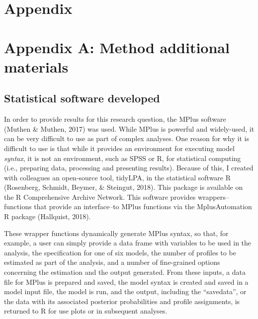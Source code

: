 \documentclass[]{book}
\theoremstyle{definition}
\theoremstyle{definition}
\theoremstyle{definition}
\theoremstyle{remark}
\begin{document}
\section{Appendix}\label{appendix}

\section{Appendix A: Method additional
materials}\label{appendix-a-method-additional-materials}

\subsection{Statistical software
developed}\label{statistical-software-developed-1}

In order to provide results for this research question, the MPlus
software (Muthen \& Muthen, 2017) was used. While MPlus is powerful and
widely-used, it can be very difficult to use as part of complex
analyses. One reason for why it is difficult to use is that while it
provides an environment for executing model \emph{syntax}, it is not an
environment, such as SPSS or R, for statistical computing (i.e.,
preparing data, processing and presenting results). Because of this, I
created with colleagues an open-source tool, tidyLPA, in the statistical
software R (Rosenberg, Schmidt, Beymer, \& Steingut, 2018). This package
is available on the R Comprehensive Archive Network. This software
provides wrappers--functions that provide an interface--to MPlus
functions via the MplusAutomation R package (Hallquist, 2018).

These wrapper functions dynamically generate MPlus syntax, so that, for
example, a user can simply provide a data frame with variables to be
used in the analysis, the specification for one of six models, the
number of profiles to be estimated as part of the analysis, and a number
of fine-grained options concerning the estimation and the output
generated. From these inputs, a data file for MPlus is prepared and
saved, the model syntax is created and saved in a model input file, the
model is run, and the output, including the ``savedata'', or the data
with its associated posterior probabilities and profile assignments, is
returned to R for use plots or in subsequent analyses.
\end{document}
